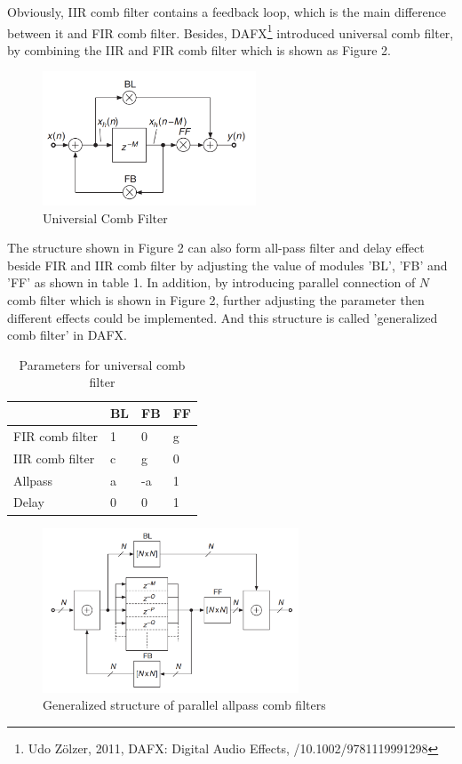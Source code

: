 \documentclass[a4paper]{tufte-handout} %
\begin{document}
Obviously, IIR comb filter contains a feedback loop, which is the main difference between it and FIR comb filter. Besides, DAFX\footnote{Udo Zölzer, 2011, DAFX: Digital Audio Effects, /10.1002/9781119991298} introduced universal comb filter, by combining the IIR and FIR comb filter which is shown as Figure 2.
\begin{figure}[h]
    \centering
	\includegraphics[width=2.5in]{Image/UniversalComb.png}
	\caption{Universial Comb Filter}
	\label{fig:textfig}
\end{figure}

The structure shown in Figure 2 can also form all-pass filter and delay effect beside FIR and IIR comb filter by adjusting the value of modules 'BL', 'FB' and 'FF' as shown in table 1. In addition, by introducing parallel connection of $N$ comb filter which is shown in Figure 2, further adjusting the parameter then different effects could be implemented. And this structure is called 'generalized comb filter' in DAFX.

\begin{table}[ht]
	\centering
	\selectfont
	\begin{tabular}{l l l l}
		\toprule
		 & BL & FB & FF \\
		\midrule
		FIR comb filter & 1 & 0 & g \\
		IIR comb filter & c & g & 0 \\
		Allpass & a & -a & 1 \\
		Delay   & 0 &  0 & 1 \\
		\bottomrule
	\end{tabular}
	\caption{Parameters for universal comb filter}
	\label{tab:normaltab}
\end{table}

\begin{figure}[h]
    \centering
	\includegraphics[width=3in]{Image/ParallelComb.png}
	\caption{Generalized structure of parallel allpass comb filters}
	\label{fig:textfig}
\end{figure}
\end{document}
